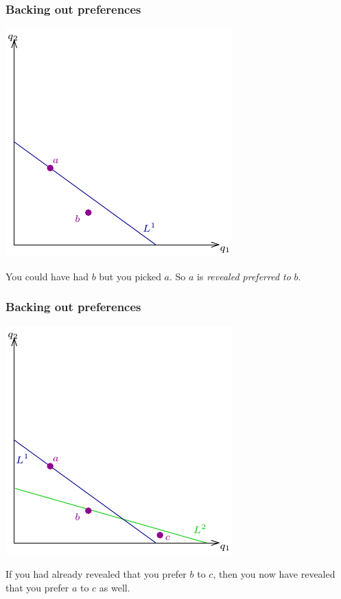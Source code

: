 \documentclass[xcolor=pdftex,dvipsnames]{beamer}
\begin{document}
\begin{frame}
\frametitle{Backing out preferences}
\begin{center}
\includegraphics{pics/RevPref1}
\end{center}
You could have had $b$ but you picked $a$. So $a$ is \emph{revealed
  preferred to }$b$.
\end{frame}

\begin{frame}
\frametitle{Backing out preferences}
\begin{center}
\includegraphics{pics/RevPref2}
\end{center}
If you had already revealed that you prefer $b$ to $c$, then you now
have revealed that you prefer $a$ to $c$ as well.
\end{frame}
\end{document}
